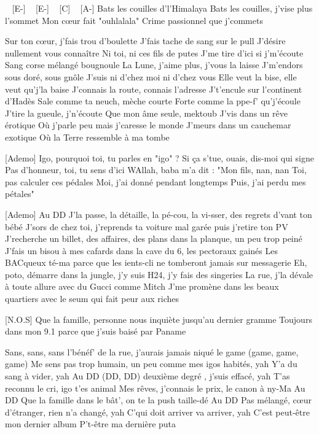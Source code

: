 \begin{guitar}
[Capo 2] ~
[E-] ~ [E-] ~ [C] ~ [A-]
Bats les couilles d'l'Himalaya
Bats les couilles, j'vise plus l'sommet
Mon cœur fait "ouhlalala"
Crime passionnel que j'commets

Sur ton cœur, j'fais trou d'boulette
J'fais tache de sang sur le pull
J'désire nullement vous connaître
Ni toi, ni ces fils de putes
J'me tire d'ici si j'm'écoute
Sang corse mélangé bougnoule
La Lune, j'aime plus, j'vous la laisse
J'm'endors sous doré, sous gnôle
J'suis ni d'chez moi ni d'chez vous
Elle veut la bise, elle veut qu'j'la baise
J'connais la route, connais l'adresse
J't'encule sur l'continent d'Hadès
Sale comme ta neuch, mèche courte
Forte comme la ppe-f' qu'j'écoule
J'tire la gueule, j'n'écoute
Que mon âme seule, mektoub
J'vis dans un rêve érotique
Où j'parle peu mais j'caresse le monde
J'meurs dans un cauchemar exotique
Où la Terre ressemble à ma tombe

[Ademo]
Igo, pourquoi toi, tu parles en "igo" ?
Si ça s'tue, ouais, dis-moi qui signe
Pas d'honneur, toi, tu sens d'ici
WAllah, baba m'a dit : "Mon fils, nan, nan
Toi, pas calculer ces pédales
Moi, j'ai donné pendant longtemps
Puis, j'ai perdu mes pétales"

[Ademo]
Au DD
J'la passe, la détaille, la pé-cou, la vi-sser, des regrets d'vant ton bébé
J'sors de chez toi, j'reprends ta voiture mal garée puis j'retire ton PV
J'recherche un billet, des affaires, des plans dans la planque, un peu trop peiné
J'fais un bisou à mes cafards dans la cave du 6, les pectoraux gainés
Les BACqueux té-ma parce que les ients-cli ne tomberont jamais sur messagerie
Eh, poto, démarre dans la jungle, j'y suis H24, j'y fais des singeries
La rue, j'la dévale à toute allure avec du Gucci comme Mitch
J'me promène dans les beaux quartiers avec le seum qui fait peur aux riches

[N.O.S]
Que la famille, personne nous inquiète jusqu'au dernier gramme
Toujours dans mon 9.1 parce que j'suis baisé par Paname

Sans, sans, sans l'bénéf' de la rue, j'aurais jamais niqué le game (game, game, game)
Me sens pas trop humain, un peu comme mes igos habités, yah
Y'a du sang à vider, yah
Au DD (DD, DD) deuxième degré , j'suis effacé, yah
T'as reconnu le cri, igo t'es animal
Mes rêves, j'connais le prix, le canon à ny-Ma
Au DD
Que la famille dans le bât', on te la push taille-dé
Au DD
Pas mélangé, cœur d'étranger, rien n'a changé, yah
C'qui doit arriver va arriver, yah
C'est peut-être mon dernier album
P't-être ma dernière puta


\end{guitar}
